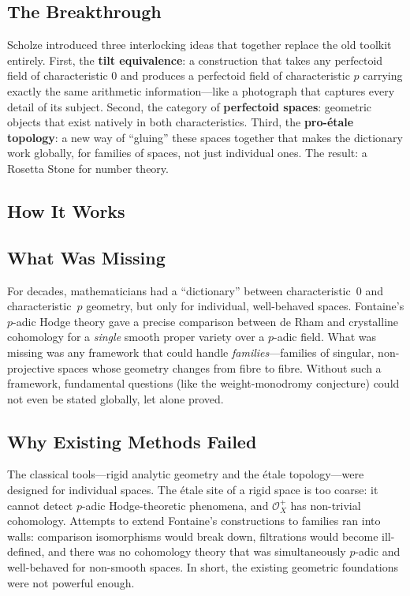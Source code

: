 \subsection{The Breakthrough}
Scholze introduced three interlocking ideas that together replace the old toolkit entirely. First, the \textbf{tilt equivalence}: a construction that takes any perfectoid field of characteristic 0 and produces a perfectoid field of characteristic $p$ carrying exactly the same arithmetic information---like a photograph that captures every detail of its subject. Second, the category of \textbf{perfectoid spaces}: geometric objects that exist natively in both characteristics. Third, the \textbf{pro-étale topology}: a new way of ``gluing'' these spaces together that makes the dictionary work globally, for families of spaces, not just individual ones. The result: a Rosetta Stone for number theory.

\subsection{How It Works}

\subsection{What Was Missing}
For decades, mathematicians had a ``dictionary'' between characteristic~$0$ and characteristic~$p$ geometry, but only for individual, well-behaved spaces. Fontaine's $p$-adic Hodge theory gave a precise comparison between de Rham and crystalline cohomology for a \emph{single} smooth proper variety over a $p$-adic field. What was missing was any framework that could handle \emph{families}---families of singular, non-projective spaces whose geometry changes from fibre to fibre. Without such a framework, fundamental questions (like the weight-monodromy conjecture) could not even be stated globally, let alone proved.

\subsection{Why Existing Methods Failed}
The classical tools---rigid analytic geometry and the étale topology---were designed for individual spaces. The étale site of a rigid space is too coarse: it cannot detect $p$-adic Hodge-theoretic phenomena, and $\mathcal{O}_X^+$ has non-trivial cohomology. Attempts to extend Fontaine's constructions to families ran into walls: comparison isomorphisms would break down, filtrations would become ill-defined, and there was no cohomology theory that was simultaneously $p$-adic and well-behaved for non-smooth spaces. In short, the existing geometric foundations were not powerful enough.

